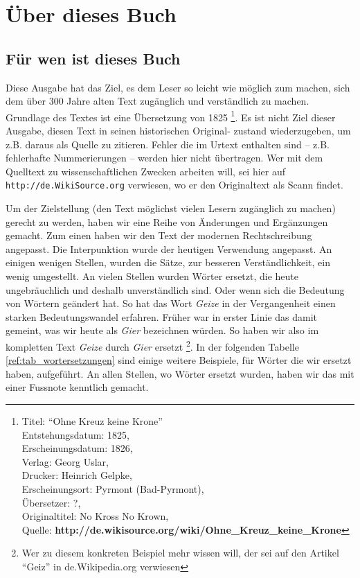 

\part{Über dieses Buch}


\chapter{Für wen ist dieses Buch}

Diese Ausgabe hat das Ziel, es dem Leser so leicht wie möglich zum machen, sich
dem über 300 Jahre alten Text zugänglich und verständlich zu machen.
 Grundlage
des Textes ist eine Übersetzung von 1825 \footnote{
Titel: "`Ohne Kreuz keine Krone"' \\
Entstehungsdatum: 1825, \\
Erscheinungsdatum: 1826, \\
Verlag: Georg Uslar, \\
Drucker: Heinrich Gelpke, \\
Erscheinungsort: Pyrmont (Bad-Pyrmont),\\
Übersetzer: ?, \\
Originaltitel: No Kross No Krown, \\
Quelle: \textbf{http://de.wikisource.org/wiki/Ohne\_Kreuz\_keine\_Krone}}. Es
ist nicht Ziel dieser Ausgabe, diesen Text in seinen historischen Original-
zustand wiederzugeben, um z.B. daraus als Quelle zu zitieren. Fehler die im
Urtext enthalten sind -- z.B. fehlerhafte Nummerierungen -- werden hier nicht
übertragen. Wer mit dem Quelltext zu wissenschaftlichen Zwecken arbeiten will,
sei hier auf \texttt{http://de.WikiSource.org} verwiesen, wo er den
Originaltext als Scann findet.

\medskip

Um der Zielstellung (den Text möglichst vielen Lesern zugänglich zu machen)
gerecht zu werden, haben wir eine Reihe von Änderungen und Ergänzungen gemacht.
Zum einen haben wir den Text der modernen Rechtschreibung angepasst. Die
Interpunktion wurde der heutigen Verwendung angepasst. An einigen wenigen Stellen,
wurden die Sätze, zur besseren Verständlichkeit, ein wenig umgestellt. An vielen
Stellen wurden Wörter ersetzt, die heute ungebräuchlich und deshalb
unverständlich sind. Oder wenn sich die Bedeutung von Wörtern geändert hat. So
hat das Wort \textit{Geize} in der Vergangenheit einen starken Bedeutungswandel
erfahren. Früher war in erster Linie das damit gemeint, was wir heute als
\textit{Gier} bezeichnen würden. So haben wir also im kompletten Text
\textit{Geize} durch \textit{Gier} ersetzt \footnote{Wer zu diesem konkreten
Beispiel mehr wissen will, der sei auf den Artikel "`Geiz"' in de.Wikipedia.org
verwiesen}. In der folgenden Tabelle \ref{ref:tab_wortersetzungen} sind einige
weitere Beispiele, für Wörter die wir ersetzt haben, aufgeführt. An allen
Stellen, wo Wörter ersetzt wurden, haben wir das mit einer Fussnote kenntlich
gemacht.

